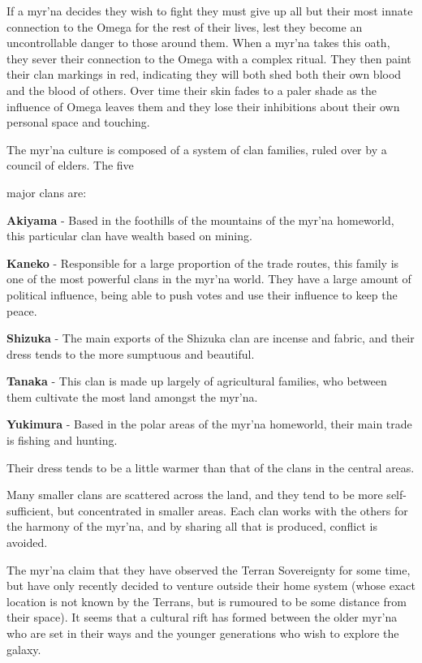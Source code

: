 \documentclass{scrbook}
\begin{document}
If a myr'na decides they wish to fight they must give up all but their most innate connection to the Omega for the rest of their lives, lest they become an uncontrollable danger to those around them. When a myr'na takes this oath, they sever their connection to the Omega with a complex ritual. They then paint their clan markings in red, indicating they will both shed both their own blood and the blood of others. Over time their skin fades to a paler shade as the influence of Omega leaves them and they lose their inhibitions about their own personal space and touching.

The myr'na culture is composed of a system of clan families, ruled over by a council of elders. The five

major clans are:

\textbf{Akiyama} - Based in the foothills of the mountains of the myr'na homeworld, this particular clan have wealth based on mining.

\textbf{Kaneko} - Responsible for a large proportion of the trade routes, this family is one of the most powerful clans in the myr'na world. They have a large amount of political influence, being able to push votes and use their influence to keep the peace.

\textbf{Shizuka} - The main exports of the Shizuka clan are incense and fabric, and their dress tends to the more sumptuous and beautiful.

\textbf{Tanaka} - This clan is made up largely of agricultural families, who between them cultivate the most land amongst the myr'na.

\textbf{Yukimura} - Based in the polar areas of the myr'na homeworld, their main trade is fishing and hunting.

Their dress tends to be a little warmer than that of the clans in the central areas.

Many smaller clans are scattered across the land, and they tend to be more self-sufficient, but concentrated in smaller areas. Each clan works with the others for the harmony of the myr'na, and by sharing all that is produced, conflict is avoided.

The myr'na claim that they have observed the Terran Sovereignty for some time, but have only recently decided to venture outside their home system (whose exact location is not known by the Terrans, but is rumoured to be some distance from their space). It seems that a cultural rift has formed between the older myr'na who are set in their ways and the younger generations who wish to explore the galaxy.
\end{document}
